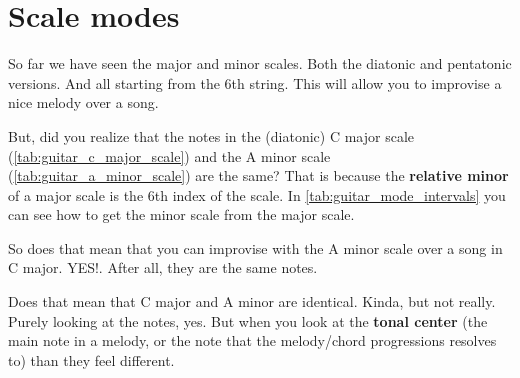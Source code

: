 \section{Scale modes}

So far we have seen the major and minor scales. Both the diatonic and pentatonic versions. And all starting from the 6th string. This will allow you to improvise a nice melody over a song.

But, did you realize that the notes in the (diatonic) C major scale (\autoref{tab:guitar_c_major_scale}) and the A minor scale (\autoref{tab:guitar_a_minor_scale}) are the same? That is because the \textbf{relative minor} of a major scale is the 6th index of the scale. In \autoref{tab:guitar_mode_intervals} you can see how to get the minor scale from the major scale.

So does that mean that you can improvise with the A minor scale over a song in C major. YES!. After all, they are the same notes.

Does that mean that C major and A minor are identical. Kinda, but not really. Purely looking at the notes, yes. But when you look at the \textbf{tonal center} (the main note in a melody, or the note that the melody/chord progressions resolves to) than they feel different.


